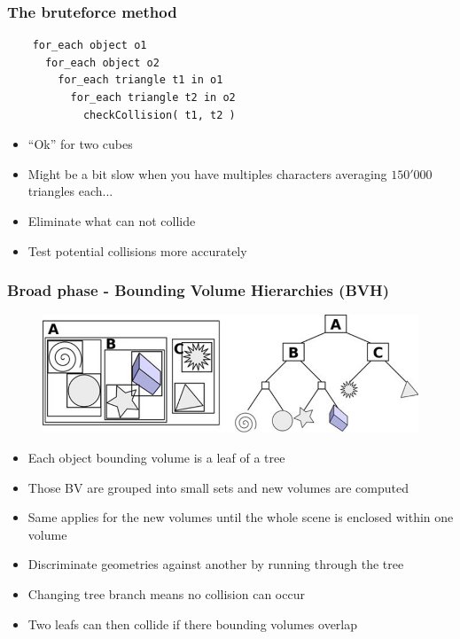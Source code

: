 \documentclass{beamer}
\begin{document}
\begin{frame}[fragile]
  \frametitle{The bruteforce method}

  \begin{lstlisting}
    for_each object o1
      for_each object o2
        for_each triangle t1 in o1
          for_each triangle t2 in o2
            checkCollision( t1, t2 )
  \end{lstlisting}

  \pause
  \begin{itemize}
  \item ``Ok'' for two cubes
  \item Might be a bit slow when you have multiples characters averaging $150'000$ triangles each...
    \pause
  \item Eliminate what can not collide
  \item Test potential collisions more accurately
  \end{itemize}
  
\end{frame}

\begin{frame}
  \frametitle{Broad phase - Bounding Volume Hierarchies (BVH)}
  
  \begin{figure}
    \centering
    \includegraphics[width=0.8\linewidth]{bvh.png}
  \end{figure}

   {
    \begin{itemize}
    \item Each object bounding volume is a leaf of a tree
    \item Those BV are grouped into small sets and new volumes are computed
    \item Same applies for the new volumes until the whole scene is enclosed within one volume
    \end{itemize}
  }

   {
    \begin{itemize}
    \item Discriminate geometries against another by running through the tree
    \item Changing tree branch means no collision can occur
    \item Two leafs can then collide if there bounding volumes overlap
    \end{itemize}
  }
  
\end{frame}
\end{document}
